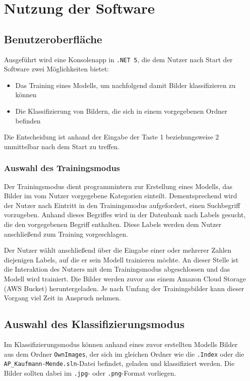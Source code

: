 \documentclass[doktyp=parbeit]{TUBAFarbeiten}
\begin{document}
\section{Nutzung der Software}
\subsection{Benutzeroberfläche}
Ausgeführt wird eine Konsolenapp in \texttt{.NET 5}, die dem Nutzer nach Start der Software zwei Möglichkeiten bietet: 
\begin{itemize}
	\item Das Training eines Modells, um nachfolgend damit Bilder klassifizieren zu können
	\item Die Klassifizierung von Bildern, die sich in einem vorgegebenen Ordner befinden
\end{itemize}
Die Entscheidung ist anhand der Eingabe der Taste 1 beziehungsweise 2 unmittelbar nach dem Start zu treffen. 
\subsubsection{Auswahl des Trainingsmodus}
Der Trainingsmodus dient programmintern zur Erstellung eines Modells, das Bilder im vom Nutzer vorgegebene Kategorien einteilt. Dementsprechend wird der Nutzer nach Eintritt in den Trainingsmodus aufgefordert, einen Suchbegriff vorzugeben. Anhand dieses Begriffes wird in der Datenbank nach Labels gesucht, die den vorgegebenen Begriff enthalten. Diese Labels werden dem Nutzer anschließend zum Training vorgeschlagen. 

Der Nutzer wählt anschließend über die Eingabe einer oder mehrerer Zahlen diejenigen Labels, auf die er sein Modell trainieren möchte. An dieser Stelle ist die Interaktion des Nutzers mit dem Trainingsmodus abgeschlossen und das Modell wird trainiert. Die Bilder werden zuvor aus einem Amazon Cloud Storage (AWS Bucket) heruntergeladen. Je nach Umfang der Trainingsbilder kann dieser Vorgang viel Zeit in Anspruch nehmen.
\subsection{Auswahl des Klassifizierungsmodus}
Im Klassifizierungsmodus können anhand eines zuvor erstellten Modells Bilder aus dem Ordner \texttt{OwnImages}, der sich im gleichen Ordner wie die \texttt{.Index} oder die \texttt{AP\_Kaufmann-Mende.sln}-Datei befindet, geladen und klassifiziert werden. Die Bilder sollten dabei im \texttt{.jpg}- oder \texttt{.png}-Format vorliegen. 
\end{document}
